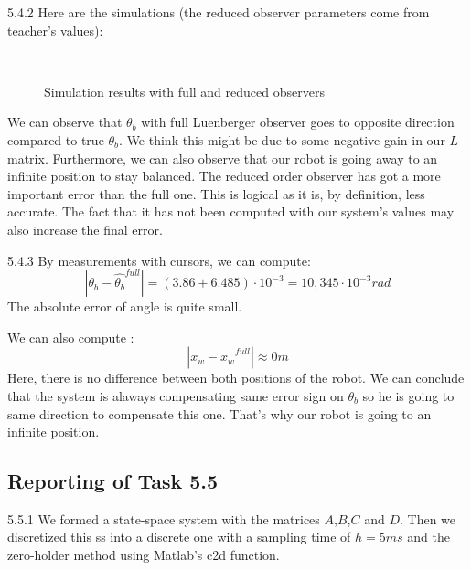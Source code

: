 \documentclass[11pt]{article}
\begin{document}
5.4.2 Here are the simulations (the reduced observer parameters come from teacher's values):
\begin{figure}[H]
  \\
  \caption{Simulation results with full and reduced observers}
  \label{fig:fig2}
\end{figure}
We can observe that $\theta_b$ with full Luenberger observer goes to opposite direction compared to true $\theta_b$. We think this might be due to some negative gain in our $L$ matrix.
Furthermore, we can also observe that our robot is going away to an infinite position to stay balanced. The reduced order observer has got a more important error than the full one. This is logical as it is, by definition, less accurate. The fact that it has not been computed with our system's values may also increase the final error.

5.4.3 By measurements with cursors, we can compute:
\begin{equation*}
\left|\theta_b - \widehat{\theta_b}^{full}\right| = (3.86+6.485)\cdot10^{-3} = 10,345\cdot10^{-3} rad
\end{equation*}
The absolute error of angle is quite small.

We can also compute :
\begin{equation*}
\left|x_w - \widehat{x_w}^{full}\right| \approx 0 m
\end{equation*}
Here, there is no difference between both positions of the robot. We can conclude that the system is alaways compensating same error sign on $\theta_b$ so he is going to same direction to compensate this one. That's why our robot is going to an infinite position.


\subsection*{Reporting of Task 5.5}
5.5.1 We formed a state-space system with the matrices $A$,$B$,$C$ and $D$. Then we discretized this ss into a discrete one with a sampling time of $h=5 ms$ and the zero-holder method using Matlab's c2d function.
\end{document}
